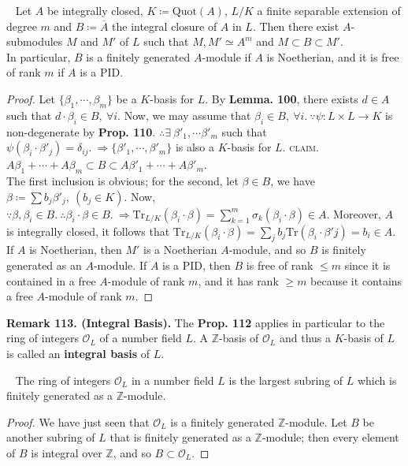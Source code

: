 \documentclass[12pt,a4paper,footinclude=true,headinclude=true]{scrbook} %
\newenvironment{proposition}[2][]
{\renewcommand\theinnercustomprop{#2}\innercustomprop[#1] 
\begin{mdframed}[backgroundcolor=gray!20]\ }
{\end{mdframed}\endinnercustomprop}
\newenvironment{corollary}[2][]
{\renewcommand\theinnercustomcol{#2}\innercustomcol[#1]
\begin{mdframed}[backgroundcolor=gray!20]\ }
{\end{mdframed}\endinnercustomcol}
\newenvironment{remark}[2][Remark]
    { \begin{mdframed}[backgroundcolor=gray!20] \textbf{#1 #2.} }
    {  \end{mdframed}}
\begin{document}
\begin{proposition}{112}
    Let $A$ be integrally closed, $K\coloneqq\mathrm{Quot}(A)$, $L/K$ a finite separable extension of degree $m$ and $B\coloneqq\overline{A}$ the integral closure of $A$ in $L$. Then there exist $A$-submodules $M$ and $M'$ of $L$ such that $M,M'\simeq A^m$ and $M\subset B\subset M'$.\\ In particular, $B$ is a finitely generated $A$-module if $A$ is Noetherian, and it is free of rank $m$ if $A$ is a PID.
\end{proposition}
\begin{proof}
    Let $\{\beta_1,\cdots,\beta_m\}$ be a $K$-basis for $L$. By \textbf{Lemma. 100}, there exists $d\in A$ such that $d\cdot\beta_i\in B,\ \forall i$. Now, we may assume that $\beta_i\in B,\ \forall i.\ \because \psi:L\times L\to K$ is non-degenerate by \textbf{Prop. 110}.  $\therefore\exists\ \beta'_1,\cdots\beta'_m$ such that $\psi(\beta_i \cdot\beta'_j)=\delta_{ij}.\ \Rightarrow \{\beta'_1,\cdots,\beta'_m\}$ is also a $K$-basis for $L$. 
    \textsc{claim.} $A\beta_1+\cdots+A\beta_m\subset B\subset A\beta'_1+\cdots+ A\beta'_m$. \\ The first inclusion is obvious; for the second, let $\beta\in B$, we have $\beta\coloneqq\sum b_j\beta'_j,\ (b_j\in K)$. Now, $\because \beta, \beta_i\in B.\ \therefore \beta_i\cdot\beta\in B.\ \Rightarrow \mathrm{Tr}_{L/K}(\beta_i\cdot\beta)=\sum_{k=1}^m\sigma_k(\beta_i\cdot\beta)\in A$. Moreover, $A$ is integrally closed, it follows that  $\mathrm{Tr}_{L/K}(\beta_i\cdot\beta)=\sum_jb_j\mathrm{Tr}(\beta_i\cdot\beta'j)=b_i\in A$.\\
    If $A$ is Noetherian, then $M'$ is a Noetherian $A$-module, and so $B$ is finitely generated as an $A$-module. If $A$ is a PID, then $B$ is free of rank $\leq m$ since it is contained in a free $A$-module of rank $m$, and it has rank $\geq m$ because it contains a free $A$-module of rank $m$.
\end{proof}

\begin{remark}{113. (Integral Basis)}
    The \textbf{Prop. 112} applies in particular to the ring of integers $\mathcal{O}_L$ of a number field $L$. A $\mathbb{Z}$-basis of $\mathcal{O}_L$ and thus a $K$-basis of $L$ is called an \textbf{integral basis} of $L$.
\end{remark}

\begin{corollary}{114}
    The ring of integers $\mathcal{O}_L$ in a number field $L$ is the largest subring of $L$ which is finitely generated as a $\mathbb{Z}$-module.
\end{corollary}
\begin{proof}
    We have just seen that $\mathcal{O}_L$ is a finitely generated $\mathbb{Z}$-module. Let $B$ be another subring of $L$ that is finitely generated as a $\mathbb{Z}$-module; then every element of $B$ is integral over $\mathbb{Z}$, and so $B\subset\mathcal{O}_L$.
\end{proof}
\end{document}
